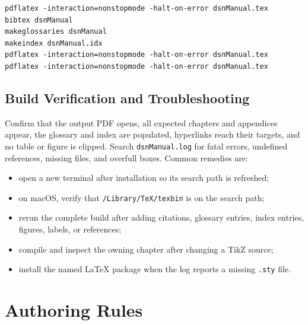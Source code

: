 \begin{verbatim}
pdflatex -interaction=nonstopmode -halt-on-error dsnManual.tex
bibtex dsnManual
makeglossaries dsnManual
makeindex dsnManual.idx
pdflatex -interaction=nonstopmode -halt-on-error dsnManual.tex
pdflatex -interaction=nonstopmode -halt-on-error dsnManual.tex
\end{verbatim}

\subsection{Build Verification and Troubleshooting}

Confirm that the output PDF opens, all expected chapters and appendices appear,
the glossary and index are populated, hyperlinks reach their targets, and no
table or figure is clipped. Search \texttt{dsnManual.log} for fatal errors,
undefined references, missing files, and overfull boxes. Common remedies are:

\begin{itemize}
\item open a new terminal after installation so its search path is refreshed;
\item on macOS, verify that \texttt{/Library/TeX/texbin} is on the search path;
\item rerun the complete build after adding citations, glossary entries, index
entries, figures, labels, or references;
\item compile and inspect the owning chapter after changing a TikZ source;
\item install the named LaTeX package when the log reports a missing
\texttt{.sty} file.
\end{itemize}

\section{Authoring Rules}

